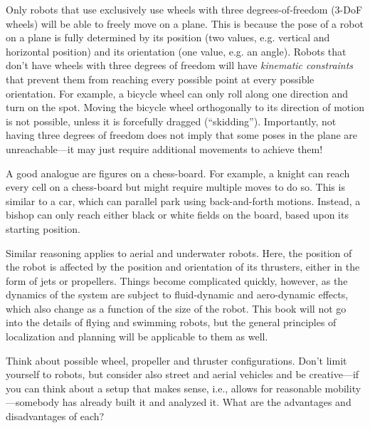 Only robots that use exclusively use wheels with three degrees-of-freedom ($3$-DoF wheels) will be able to freely move on a plane. This is because the pose of a robot on a plane is fully determined by its position (two values, e.g. vertical and horizontal position) and its orientation (one value, e.g. an angle). Robots that don't have wheels with three degrees of freedom will have \textsl{kinematic constraints} that prevent them from reaching every possible point at every possible orientation. For example, a bicycle wheel can only roll along one direction and turn on the spot. Moving the bicycle wheel orthogonally to its direction of motion is not possible, unless it is forcefully dragged (``skidding''). Importantly, not having three degrees of freedom does not imply that some poses in the plane are unreachable---it may just require additional movements to achieve them!

A good analogue are figures on a chess-board. For example, a knight can reach every cell on a chess-board but might require multiple moves to do so. This is similar to a car, which can parallel park using back-and-forth motions. Instead, a bishop can only reach either black or white fields on the board, based upon its starting position.

Similar reasoning applies to aerial and underwater robots. Here, the position of the robot is affected by the position and orientation of its thrusters, either in the form of jets or propellers. Things become complicated quickly, however, as the dynamics of the system are subject to fluid-dynamic and aero-dynamic effects, which also change as a function of the size of the robot. This book will not go into the details of flying and swimming robots, but the general principles of localization and planning will be applicable to them as well.

\begin{mdframed} Think about possible wheel, propeller and thruster configurations. Don't limit yourself to robots, but consider also street and aerial vehicles and be creative---if you can think about a setup that makes sense, i.e., allows for reasonable mobility---somebody has already built it and analyzed it. What are the advantages and disadvantages of each?
\end{mdframed}

